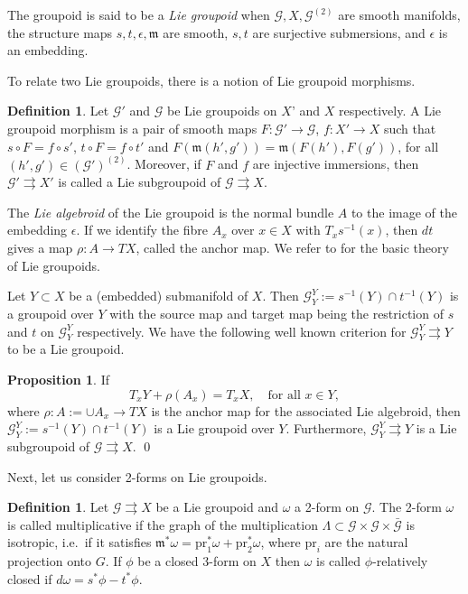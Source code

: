 \documentclass[a4paper,12pt,leqno]{amsart}
\numberwithin{equation}{section}
\theoremstyle{plain}
\theoremstyle{definition}
\newcommand{\eps}{\epsilon}
\newcommand{\m}{\mathfrak{m}}
\newcommand{\cG}{\mathcal{G}}
\newcommand{\fm}{\mathfrak{m}}
\newcommand{\pr}{\mathrm{pr}}
\newtheorem{pro}[thm]{Proposition}
\newtheorem{df}[thm]{Definition}
\begin{document}
The groupoid is said to be a
{\em Lie groupoid} when $\cG,X,\cG^{(2)}$ are smooth manifolds,
the structure maps $s,t,\eps,\m$ are smooth,  $s,t$ are surjective submersions,
and $\eps$ is an embedding.

To relate two Lie groupoids, there is a notion of Lie groupoid morphisms.

\begin{df}
Let $\cG'$ and $\cG$ be Lie groupoids on $X’$ and $X$ respectively. A Lie groupoid morphism is a pair of smooth maps $F:\cG' \to \cG$, $f:X'\to X$ such that $s\circ F=f\circ s'$, $t\circ F=f\circ t'$ and $F(\fm(h',g'))=\fm(F(h'),F(g'))$, for all $(h',g')\in (\cG')^{(2)}$. Moreover, if $F$ and $f$ are injective immersions, then $\cG'\rightrightarrows X'$ is called a Lie subgroupoid of $\cG\rightrightarrows X$.
\end{df}

The {\em Lie algebroid} of the Lie groupoid is the
normal bundle $A$ to the image of the embedding $\eps$.
If we identify the fibre $A_x$ over $x\in X$
with $T_x s^{-1}(x)$,  then $dt$ gives a map $\rho:A\to TX$, called
the anchor map.
We refer to \cite{Ma01} for the basic theory of Lie groupoids.

Let $Y\subset X$ be a (embedded) submanifold of $X$. Then
$\cG^Y_Y:=s^{-1}(Y)\cap t^{-1}(Y)$ is a groupoid over $Y$ with the source map and target map being the restriction of  $s$ and $t$ on $\cG^Y_Y$ respectively. We have the following
well known
criterion for $\cG^Y_Y \rightrightarrows Y$ to be a Lie groupoid.
\begin{pro}\label{pro:NLiegroupoid}
If
\[ T_{x}Y+\rho(A_x)=T_x X, \quad \mbox{for all }x\in Y,\]
where $\rho:A:=\cup A_x \to TX$ is the anchor map for the associated Lie algebroid, then $\cG^Y_Y:=s^{-1}(Y)\cap t^{-1}(Y)$ is a Lie groupoid over $Y$.
Furthermore, $\cG^Y_Y\rightrightarrows Y$ is a Lie subgroupoid of $\cG\rightrightarrows X$.
\qed
\end{pro}

Next, let us consider 2-forms on Lie groupoids.

\begin{df}
Let $\cG\rightrightarrows X$ be a Lie groupoid and $\omega$ a 2-form on $\cG$. The 2-form $\omega$ is called multiplicative if the graph of the multiplication $\Lambda\subset \cG\times \cG\times \bar{\cG}$ is isotropic, i.e.\ if it satisfies  $\fm^*\omega=\pr_1^*\omega+\pr_2^*\omega$, where $\pr_i$ are the natural projection onto $G$. If $\phi$ be a closed 3-form on $X$ then $\omega$ is called $\phi$-relatively closed if $d\omega=s^*\phi-t^*\phi$.
\end{df}
\end{document}
